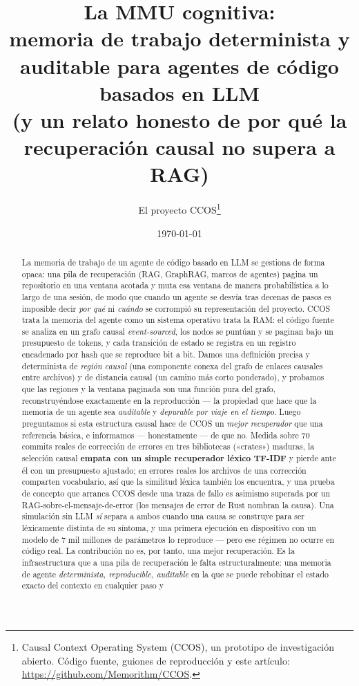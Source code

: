 \documentclass[11pt]{article}
\title{\textbf{La MMU cognitiva:\\ memoria de trabajo determinista y auditable para agentes de código basados en LLM\\ \large (y un relato honesto de por qué la recuperación causal no supera a RAG)}}
\author{El proyecto CCOS\thanks{Causal Context Operating System (CCOS), un prototipo
de investigación abierto. Código fuente, guiones de reproducción y este artículo:
\url{https://github.com/Memorithm/CCOS}.}}
\date{\today}
\begin{document}
\maketitle

\begin{abstract}
La memoria de trabajo de un agente de código basado en LLM se gestiona de forma
opaca: una pila de recuperación (RAG, GraphRAG, marcos de agentes) pagina un
repositorio en una ventana acotada y muta esa ventana de manera probabilística a lo
largo de una sesión, de modo que cuando un agente se desvía tras decenas de pasos es
imposible decir \emph{por qué} ni \emph{cuándo} se corrompió su representación del
proyecto. CCOS trata la memoria del agente como un sistema operativo trata la RAM: el
código fuente se analiza en un grafo causal \emph{event-sourced}, los nodos se
puntúan y se paginan bajo un presupuesto de tokens, y cada transición de estado se
registra en un registro encadenado por hash que se reproduce bit a bit. Damos una
definición precisa y determinista de \emph{región causal} (una componente conexa del
grafo de enlaces causales entre archivos) y de distancia causal (un camino más corto
ponderado), y probamos que las regiones y la ventana paginada son una función pura
del grafo, reconstruyéndose exactamente en la reproducción --- la propiedad que hace
que la memoria de un agente sea \emph{auditable} y \emph{depurable por viaje en el
tiempo}. Luego preguntamos si esta estructura causal hace de CCOS un \emph{mejor
recuperador} que una referencia básica, e informamos --- honestamente --- de que no.
Medida sobre $70$ commits reales de corrección de errores en tres bibliotecas
(«crates») maduras, la selección causal \textbf{empata con un simple recuperador
léxico TF-IDF} y pierde ante él con un presupuesto ajustado; en errores reales los
archivos de una corrección comparten vocabulario, así que la similitud léxica también
los encuentra, y una prueba de concepto que arranca CCOS desde una traza de fallo es
asimismo superada por un RAG-sobre-el-mensaje-de-error (los mensajes de error de Rust
nombran la causa). Una simulación sin LLM \emph{sí} separa a ambos cuando una causa se
construye para ser léxicamente distinta de su síntoma, y una primera ejecución en
dispositivo con un modelo de $7$ mil millones de parámetros lo reproduce --- pero ese
régimen no ocurre en código real. La contribución no es, por tanto, una mejor
recuperación. Es la infraestructura que a una pila de recuperación le falta
estructuralmente: una memoria de agente \emph{determinista, reproducible, auditable}
en la que se puede rebobinar el estado exacto del contexto en cualquier paso y

\end{abstract}
\end{document}
